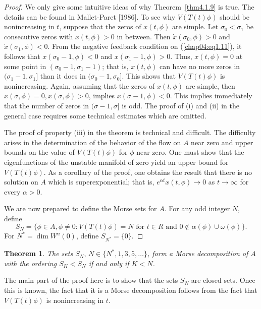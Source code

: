 \documentclass{surv-l}
\theoremstyle{plain}
\newtheorem{theorem}{Theorem}[section]
\theoremstyle{definition}
\numberwithin{equation}{section}
\numberwithin{figure}{chapter}
\begin{document}
\begin{proof}
We only give some intuitive ideas of why Theorem~\ref{thm4.1.9} is true. The details can be found in Mallet-Paret [1986]. To see why $V(T(t)\phi)$ should be nonincreasing in $t$, suppose that the zeros of $x(t,\phi)$ are simple. Let $\sigma_{0}<\sigma_{1}$ be consecutive zeros with $x(t, \phi)>0$ in between. Then $\dot{x}(\sigma_{0}, \phi)>0$ and $\dot{x}(\sigma_{1}, \phi)< 0$. From the negative feedback condition on (\ref{chap04:eq1.11}), it follows that $x(\sigma_{0}-1, \phi)<0$ and $x(\sigma_{1}-1, \phi)>0$. Thus, $x(t, \phi)=0$ at some point in $(\sigma_{0}-1, \sigma_{1}-1)$; that is, $x(t, \phi)$ can have no more zeros in $(\sigma_{1}-1, \sigma_{1}]$ than it does in $(\sigma_{0}-1, \sigma_{0}]$. This shows that $V(T(t)\phi)$ is nonincreasing. Again, assuming that the zeros of $x(t, \phi)$ are simple, then $x(\sigma, \phi)=0,\dot{x}(\sigma, \phi)>0$, implies $x(\sigma-1, \phi)<0$. This implies immediately that the number of zeros in $(\sigma-1, \sigma]$ is odd. The proof of (i) and (ii) in the general case requires some technical estimates which are omitted.

The proof of property (iii) in the theorem is technical and difficult. The difficulty arises in the determination of the behavior of the flow on $A$ near zero and upper bounds on the value of $V(T(t)\phi)$ for $\phi$ near zero. One must show that the eigenfunctions of the unstable manifold of zero yield an upper bound for $V(T(t)\phi)$. As a corollary of the proof, one obtains the result that there is no solution on $A$ which is superexponential; that is, $e^{\alpha t}x(t, \phi)\rightarrow 0$ as $ t\rightarrow\infty$ for every $\alpha>0$.

We are now prepared to define the Morse sets for $A$. For any odd integer $N$, define
\begin{equation*}
S_{N}=\{\phi\in A,\phi\neq 0\!:V(T(t)\phi)=N \text{ for } t\in R \text{ and } 0\not\in\alpha(\phi)\cup\omega(\phi)\}.
\end{equation*}
For $N^{\ast}=\dim W^{u}(0)$, define $S_{N^{\ast}}=\{0\}$.
\end{proof}

\begin{theorem}\label{thm4.1.10}
The sets $S_{N},\,N\in\{N^{\ast}, 1,3,5, \ldots\}$, form a Morse decomposition of $A$ with the ordering $S_{K}<S_{N}$ if and only if $K<N$.
\end{theorem}

The main part of the proof here is to show that the sets $S_{N}$ are closed sets. Once this is known, the fact that it is a Morse decomposition follows from the fact that $V(T(t)\phi)$ is nonincreasing in $t$.
\end{document}
